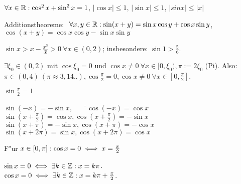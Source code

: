 \documentclass[a4paper,twoside,DIV15,BCOR12mm]{scrbook}
\begin{document}
\begin{satz}
\begin{liste}
\item $\forall x \in \mathbb{R}: \cos^2 x + \sin^2 x = 1$, $|\cos x| \le 1$, $|\sin x| \le 1$, $|sin x| \le |x|$
\item Additionstheoreme: $\ \forall x,y \in \mathbb{R}: \sin(x+y) = \sin x \cos y + \cos x \sin y$, $\cos(x+y) = \cos x \cos y - \sin x \sin y$
\item $\sin x > x - \frac{x^3}{3!} > 0 \ \forall x \in (0, 2)$; insbesondere: $\sin 1 > \frac{5}{6}$.
\item $\exists \xi_0 \in (0, 2)$ mit $\cos \xi_0=0$ und $\cos x \ne 0\ \forall x \in [0, \xi_0), \pi:=2\xi_0$ (Pi). Also: $\pi \in (0, 4)\ (\pi \approx 3,14..), \cos\frac{\pi}{2}=0, \cos x \ne 0 \ \forall x \in [0, \frac{\pi}{2}]$.
\item $\sin\frac{\pi}{2}=1$
\item \begin{tabbing}
$\sin(-x)=-\sin x, $\ \ \ \ \=$\cos(-x)=\cos x$\\
$\sin(x+\frac{\pi}{2})=\cos x, $\>$\cos(x+\frac{\pi}{2})=-\sin x$\\
$\sin(x+\pi)=-\sin x, $\>$\cos(x+\pi)=-\cos x$\\
$\sin(x+2\pi)=\sin x, $\>$\cos(x+2\pi)=\cos x$
\end{tabbing}
\item F"ur $x \in [0, \pi]: \cos x = 0 \iff x=\frac{\pi}{2}$
\item $\sin x=0 \iff \exists k \in \mathbb{Z}: x = k\pi$. \\
	$\cos x=0 \iff \exists k \in \mathbb{Z}: x = k\pi+\frac{\pi}{2}$.
\end{liste}
\end{satz}
\end{document}
